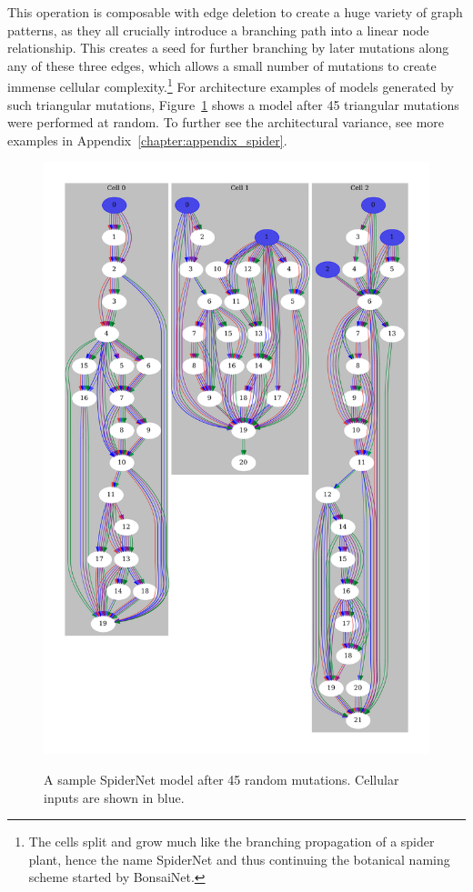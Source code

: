 \noindent This operation
is composable with edge deletion to create a huge variety of graph patterns, as they all crucially introduce a branching
path into a linear node relationship. This creates a seed for further branching by later
mutations along any of these three edges, which allows a small number of mutations to create immense cellular
complexity.\footnote{The cells split and grow much like the branching propagation of a spider
plant, hence the name SpiderNet and thus continuing the botanical naming scheme started by BonsaiNet.}
For architecture examples of models generated by such triangular mutations, Figure~\ref{fig:spider_rand0_example_main_body}
shows a model after 45 triangular mutations were performed at random. To further see the architectural variance, see more
examples in Appendix~\ref{chapter:appendix_spider}.

\begin{figure}[p]
    \centering
	\includegraphics[width=\linewidth, trim={0 1cm 0 1cm}, clip]{graphs/random-2-2} \\
    \caption{A sample SpiderNet model after 45 random mutations. Cellular inputs are shown in blue.}
    \label{fig:spider_rand0_example_main_body}
\end{figure}

